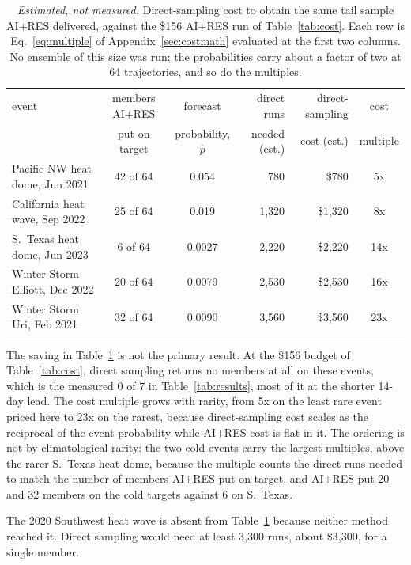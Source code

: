\documentclass[11pt]{article}
\begin{document}
\begin{table}[h]
\centering\small\setlength{\tabcolsep}{7pt}
\caption{\emph{Estimated, not measured.} Direct-sampling cost to obtain the same tail sample
AI+RES delivered, against the \$156 AI+RES run of Table~\ref{tab:cost}. Each row is
Eq.~\eqref{eq:multiple} of Appendix~\ref{sec:costmath} evaluated at the first two columns. No
ensemble of this size was run; the probabilities carry about a factor of two at 64 trajectories,
and so do the multiples.}
\label{tab:savings}
\begin{tabular}{@{}l c c r r c@{}}
\toprule
event & members AI+RES & forecast & direct runs & direct-sampling & cost \\
      & put on target  & probability, $\hat{p}$ & needed (est.) & cost (est.) & multiple \\
\midrule
Pacific NW heat dome, Jun 2021 & 42 of 64 & 0.054 & 780   & \$780   & 5x  \\
California heat wave, Sep 2022 & 25 of 64 & 0.019 & 1,320 & \$1,320 & 8x  \\
S.\ Texas heat dome, Jun 2023  & 6 of 64  & 0.0027 & 2,220 & \$2,220 & 14x \\
Winter Storm Elliott, Dec 2022 & 20 of 64 & 0.0079 & 2,530 & \$2,530 & 16x \\
Winter Storm Uri, Feb 2021     & 32 of 64 & 0.0090 & 3,560 & \$3,560 & 23x \\
\bottomrule
\end{tabular}
\end{table}

The saving in Table~\ref{tab:savings} is not the primary result. At the \$156 budget of
Table~\ref{tab:cost}, direct sampling returns no members at all on these events, which is the
measured 0 of 7 in Table~\ref{tab:results}, most of it at the shorter 14-day lead. The cost multiple grows with rarity, from 5x on the
least rare event priced here to 23x on the rarest, because direct-sampling cost scales as the
reciprocal of the event probability while AI+RES cost is flat in it. The ordering is not by
climatological rarity: the two cold events carry the largest multiples, above the rarer S.\ Texas
heat dome, because the multiple counts the direct runs needed to match the number of members AI+RES
put on target, and AI+RES put 20 and 32 members on the cold targets against 6 on S.\ Texas.

The 2020 Southwest heat wave is absent from Table~\ref{tab:savings} because neither method
reached it. Direct sampling would need at least 3,300 runs, about \$3,300, for a single member.
\end{document}
